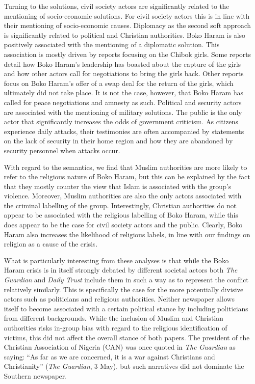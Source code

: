 Turning to the solutions, civil society actors are significantly related to the mentioning of socio-economic solutions. For civil society actors this is in line with their mentioning of socio-economic causes. Diplomacy as the second soft approach is significantly related to political and Christian authorities. Boko Haram is also positively associated with the mentioning of a diplomatic solution. This association is mostly driven by reports focusing on the Chibok girls. Some reports detail how Boko Haram's leadership has boasted about the capture of the girls and how other actors call for negotiations to bring the girls back. Other reports focus on Boko Haram's offer of a swap deal for the return of the girls, which ultimately did not take place. It is not the case, however, that Boko Haram has called for peace negotiations and amnesty as such. Political and security actors are associated with the mentioning of military solutions. The public is the only actor that significantly increases the odds of government criticism. As citizens experience daily attacks, their testimonies are often accompanied by statements on the lack of security in their home region and how they are abandoned by security personnel when attacks occur. 


With regard to the semantics, we find that Muslim authorities are more likely to refer to the religious nature of Boko Haram, but this can be explained by the fact that they mostly counter the view that Islam is associated with the group's violence. Moreover, Muslim authorities are also the only actors associated with the criminal labelling of the group. Interestingly, Christian authorities do not appear to be associated with the religious labelling of Boko Haram, while this does appear to be the case for civil society actors and the public. Clearly, Boko Haram also increases the likelihood of religious labels, in line with our findings on religion as a cause of the crisis. 

What is particularly interesting from these analyses is that while the Boko Haram crisis is in itself strongly debated by different societal actors both \textit{The Guardian} and \textit{Daily Trust} include them in such a way as to represent the conflict relatively similarly. This is specifically the case for the more potentially divisive actors such as politicians and religious authorities. Neither newspaper allows itself to become associated with a certain political stance by including politicians from different backgrounds. While the inclusion of Muslim and Christian authorities risks in-group bias with regard to the religious identification of victims, this did not affect the overall stance of both papers. The president of the Christian Association of Nigeria (CAN) was once quoted in \textit{The Guardian} as saying: ``As far as we are concerned, it is a war against Christians and Christianity'' (\textit{The Guardian}, 3 May), but such narratives did not dominate the Southern newspaper.



